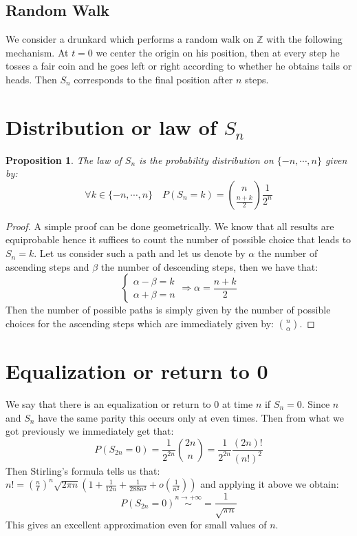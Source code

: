 \documentclass[10pt,a4paper]{book}
\newtheorem{proposition}{Proposition}[section]
\theoremstyle{definition}
\begin{document}
\subsection{Random Walk} We consider a drunkard which performs a random walk on $\mathbb{Z}$ with the following mechanism. At $t=0$ we center the origin on his position, then at every step he tosses a fair coin and he goes left or right according to whether he obtains tails or heads. Then $S_n$ corresponds to the final position after $n$ steps.
\begin{figure}
\centering
{}
\end{figure}

\section{Distribution or law of $S_n$}
\begin{proposition}
The law of $S_n$ is the probability distribution on $\{-n, \cdots, n\}$ given by:
\[
\forall k \in \{-n, \cdots, n\} \quad P(S_n = k) = \binom{n}{\frac{n + k}{2}} \frac{1}{2^n}
\]
\end{proposition}
\begin{proof}
A simple proof can be done geometrically. We know that all results are equiprobable hence it suffices to count the number of possible choice that leads to $S_n = k$. Let us consider such a path and let us denote by $\alpha$ the number of ascending steps and $\beta$ the number of descending steps, then we have that:
\[
\begin{cases}
\alpha - \beta = k\\
\alpha + \beta = n
\end{cases}
\Rightarrow \alpha = \frac{n + k}{2}
\] 
Then the number of possible paths is simply given by the number of possible choices for the ascending steps which are immediately given by: $\binom{n}{\alpha}$.
\end{proof}

\section{Equalization or return to 0} We say that there is an equalization or return to 0 at time $n$ if $S_n = 0$. Since $n$ and $S_n$ have the same parity this occurs only at even times. Then from what we got previously we immediately get that:
\[
P(S_{2n} = 0) = \frac{1}{2^{2n}} \binom{2n}{n} = \frac{1}{2^{2n}} \frac{(2n)!}{(n!)^2}
\]
Then Stirling's formula tells us that: $n! = \left(\frac{n}{\ell}\right)^n \sqrt{2\pi n} \left( 1 + \frac{1}{12 n} + \frac{1}{288 n^2} + o(\frac{1}{n^2})\right)$ and applying it above we obtain:
\[
P(S_{2n} = 0) \stackrel{n \to +\infty}{\sim} = \frac{1}{\sqrt{\pi n}}
\]
This gives an excellent approximation even for small values of $n$.
\end{document}
